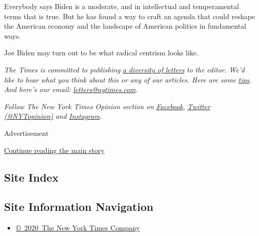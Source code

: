 Everybody says Biden is a moderate, and in intellectual and
temperamental terms that is true. But he has found a way to craft an
agenda that could reshape the American economy and the landscape of
American politics in fundamental ways.

Joe Biden may turn out to be what radical centrism looks like.

\emph{The Times is committed to publishing}
\href{https://www.nytimes.com/2019/01/31/opinion/letters/letters-to-editor-new-york-times-women.html}{\emph{a
diversity of letters}} \emph{to the editor. We'd like to hear what you
think about this or any of our articles. Here are some}
\href{https://help.nytimes.com/hc/en-us/articles/115014925288-How-to-submit-a-letter-to-the-editor}{\emph{tips}}\emph{.
And here's our email:}
\href{mailto:letters@nytimes.com}{\emph{letters@nytimes.com}}\emph{.}

\emph{Follow The New York Times Opinion section on}
\href{https://www.facebook.com/nytopinion}{\emph{Facebook}}\emph{,}
\href{http://twitter.com/NYTOpinion}{\emph{Twitter (@NYTopinion)}}
\emph{and}
\href{https://www.instagram.com/nytopinion/}{\emph{Instagram}}\emph{.}

Advertisement

\protect\hyperlink{after-bottom}{Continue reading the main story}

\hypertarget{site-index}{%
\subsection{Site Index}\label{site-index}}

\hypertarget{site-information-navigation}{%
\subsection{Site Information
Navigation}\label{site-information-navigation}}

\begin{itemize}
\tightlist
\item
  \href{https://help.nytimes.com/hc/en-us/articles/115014792127-Copyright-notice}{©~2020~The
  New York Times Company}
\end{itemize}

